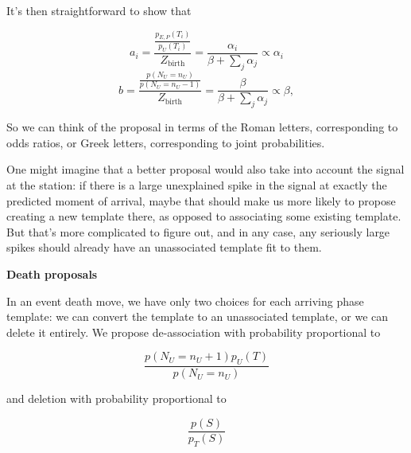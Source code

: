 \documentclass{article}
\begin{document}
It's then straightforward to show that

\[a_i = \frac{\frac{p_{E, P}(T_i)}{p_U(T_i)}}{Z_\text{birth}} = \frac{\alpha_i}{\beta + \sum_j \alpha_j} \propto \alpha_i\]
\[b = \frac{\frac{p(N_U = n_U)}{p(N_U = n_U - 1)}}{Z_\text{birth}} = \frac{\beta}{\beta + \sum_j \alpha_j} \propto \beta,\]

So we can think of the proposal in terms of the Roman letters, corresponding to odds ratios, or Greek letters, corresponding to joint probabilities. 

One might imagine that a better proposal would also take into account the signal at the station: if there is a large unexplained spike in the signal at exactly the predicted moment of arrival, maybe that should make us more likely to propose creating a new template there, as opposed to associating some existing template. But that's more complicated to figure out, and in any case, any seriously large spikes should already have an unassociated template fit to them. 



{\bf Death proposals}

In an event death move, we have only two choices for each arriving phase template: we can convert the template to an unassociated template, or we can delete it entirely. We propose de-association with probability proportional to 

\[\frac{p(N_U = n_U + 1)p_U(T)}{p(N_U = n_U)}\]


and deletion with probability proportional to 

\[\frac{p(S)}{p_T(S)}\]

\end{document}

